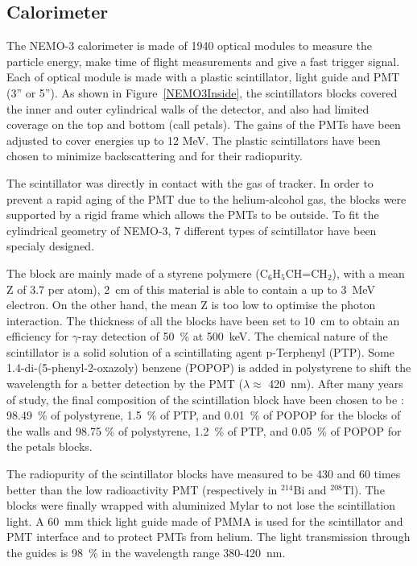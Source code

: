 \documentclass[main.tex]{subfiles}
\begin{document}
\FloatBarrier


\subsection{Calorimeter}


\NI The NEMO-3 calorimeter is made of 1940 optical modules to measure the particle energy, make time of flight measurements and give a fast trigger signal. Each of optical module is made with a plastic scintillator, light guide and PMT (3'' or 5''). As shown in Figure~\ref{NEMO3Inside},  the scintillators blocks covered the inner and outer cylindrical walls of the detector, and also had limited coverage on the top and bottom (call petals). The gains of the PMTs have been adjusted to cover energies up to 12 MeV. The plastic scintillators have been chosen to minimize backscattering and for their radiopurity.


\bigskip


\NI The scintillator was directly in contact with the gas of tracker. In order to prevent a rapid aging of the PMT due to the helium-alcohol gas, the blocks were supported by a rigid frame which allows the PMTs to be outside. To fit the cylindrical geometry of NEMO-3, 7 different types of scintillator have been specialy designed.


\bigskip


\NI The block are mainly made of a styrene polymere (C$_\text{6}$H$_\text{5}$CH=CH$_\text{2}$), with a mean Z of 3.7 per atom), 2~cm of this material is able to contain a up to 3~MeV electron. On the other hand, the mean Z is too low to optimise the photon interaction. The thickness of all the blocks have been set to 10~cm to obtain an efficiency for $\gamma$-ray detection of 50~\% at 500~keV. The chemical nature of the scintillator is a solid solution of a scintillating agent p-Terphenyl (PTP). Some 1.4-di-(5-phenyl-2-oxazoly) benzene (POPOP) is added in polystyrene to shift the wavelength for a better detection by the PMT ($\lambda \approx$ 420~nm). After many years of study, the final composition of the scintillation block have been chosen to be : 98.49~\% of polystyrene, 1.5~\% of PTP, and 0.01~\% of POPOP for the blocks of the walls and 98.75 \% of polystyrene, 1.2~\% of PTP, and 0.05~\% of POPOP for the petals blocks.


\bigskip


\NI The radiopurity of the scintillator blocks have measured to be 430 and 60 times better than the low radioactivity PMT (respectively in $^{\text{214}}$Bi and $^{\text{208}}$Tl). The blocks were finally wrapped with aluminized Mylar to not lose the scintillation light. A 60~mm thick light guide made of PMMA is used for the scintillator and PMT interface and to protect PMTs from helium. The light transmission through the guides is 98~\% in the wavelength range 380-420~nm.
\end{document}
